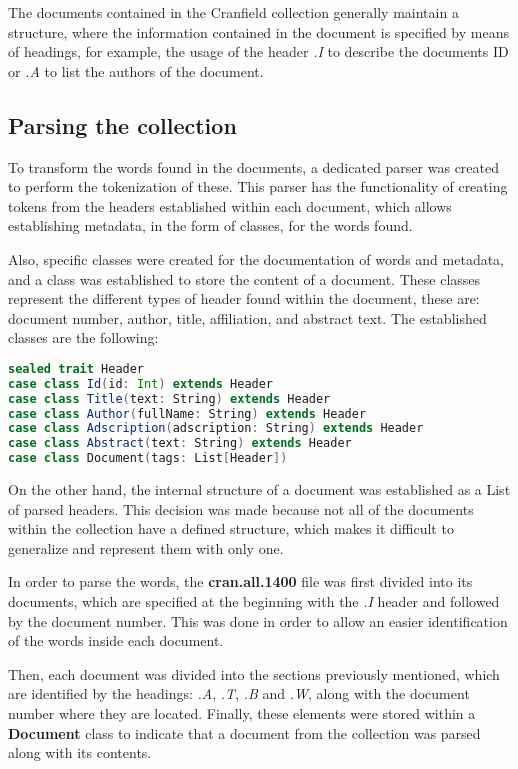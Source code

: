 \documentclass{article}
\begin{document}
The documents contained in the Cranfield collection generally maintain a structure, where the information contained in the document is specified by means of headings, for example, the usage of the header \textit{.I} to describe the documents ID or \textit{.A} to list the authors of the document.


\subsection{Parsing the collection}

To transform the words found in the documents, a dedicated parser was created to perform the tokenization of these. This parser has the functionality of creating tokens from the headers established within each document, which allows establishing metadata, in the form of classes, for the words found.

Also, specific classes were created for the documentation of words and metadata, and a class was established to store the content of a document. These classes represent the different types of header found within the document, these are: document number, author, title, affiliation, and abstract text. The established classes are the following:

\begin{lstlisting}[language=Scala]
sealed trait Header
case class Id(id: Int) extends Header
case class Title(text: String) extends Header
case class Author(fullName: String) extends Header
case class Adscription(adscription: String) extends Header
case class Abstract(text: String) extends Header
case class Document(tags: List[Header])
	\end{lstlisting}

On the other hand, the internal structure of a document was established as a List of parsed headers. This decision was made because not all of the documents within the collection have a defined structure, which makes it difficult to generalize and represent them with only one.

In order to parse the words, the \textbf{cran.all.1400} file was first divided into its documents, which are specified at the beginning with the \textit{.I} header and followed by the document number. This was done in order to allow an easier identification of the words inside each document.

Then, each document was divided into the sections previously mentioned, which are identified by the headings: \textit{.A}, \textit{.T}, \textit{.B} and \textit{.W}, along with the document number where they are located. Finally, these elements were stored within a \textbf{Document} class to indicate that a document from the collection was parsed along with its contents.
\end{document}

